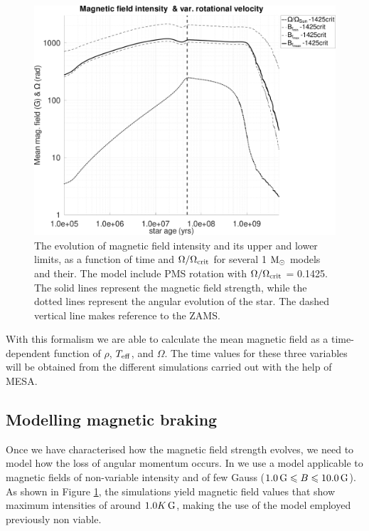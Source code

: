 \documentclass[fleqn,usenatbib]{mnras}
\begin{document}
\begin{figure}
	\includegraphics[clip,width=\columnwidth]{figures/paper2/mag_field_limits_var_vel_g3.pdf}
    \caption{The evolution of magnetic field intensity and its upper and lower limits, as a function of time and $\Omega / \Omega_{\mathrm{crit}}$ for several 1 $\mathrm{M}_\odot$ models and their. The model include PMS rotation with $\Omega / \Omega_{\mathrm{crit}}$ = 0.1425. The solid lines represent the magnetic field strength, while the dotted lines represent the angular evolution of the star. The dashed vertical line makes reference to the ZAMS.}
    \label{fig:mag_field_limits_var_vel_g3}
\end{figure}

With this formalism we are able to calculate the mean magnetic field as a time-dependent function of $\rho$, $T_{\mathrm{eff}}$, and $\Omega$. The time values for these three variables will be obtained from the different simulations carried out with the help of MESA.

\subsection{Modelling magnetic braking} \label{mod_mb}
Once we have characterised how the magnetic field strength evolves, we need to model how the loss of angular momentum occurs.  In \cite{Navarro2020} we use a model applicable to magnetic fields of non-variable intensity and of few Gauss ($1.0\,\mathrm{G} \leqslant B \leqslant 10.0\,\mathrm{G}$). As shown in Figure \ref{fig:mag_field_limits_var_vel_g3}, the simulations yield magnetic field values that show maximum intensities of around $1.0K\,\mathrm{G}$, making the use of the model employed previously non viable. \par
\end{document}
